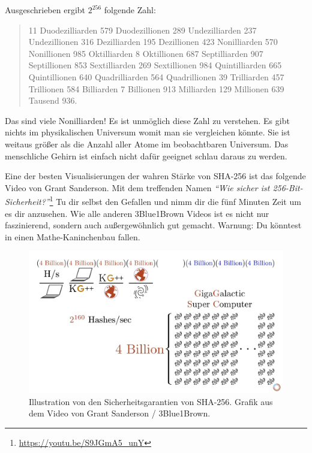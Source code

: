 Ausgeschrieben ergibt $2^{256}$ folgende Zahl:

\begin{quotation}\begin{samepage}
    11 Duodezilliarden 579 Duodezillionen 289 Undezilliarden 237 Undezillionen
    316 Dezilliarden 195 Dezillionen 423 Nonilliarden 570 Nonillionen 985
    Oktilliarden 8 Oktillionen 687 Septilliarden 907 Septillionen 853
    Sextilliarden 269 Sextillionen 984 Quintilliarden 665 Quintillionen 640
    Quadrilliarden 564 Quadrillionen 39 Trilliarden 457 Trillionen 584
    Billiarden 7 Billionen 913 Milliarden 129 Millionen 639 Tausend 936.
\end{samepage}\end{quotation}

Das sind viele Nonilliarden! Es ist unmöglich diese Zahl zu verstehen. Es gibt
nichts im physikalischen Universum womit man sie vergleichen könnte. Sie ist
weitaus größer als die Anzahl aller Atome im beobachtbaren Universum. Das
menschliche Gehirn ist einfach nicht dafür geeignet schlau daraus zu werden.

Eine der besten Visualisierungen der wahren Stärke von SHA-256 ist das folgende
Video von Grant Sanderson. Mit dem treffenden Namen \textit{\enquote{Wie sicher
ist 256-Bit-Sicherheit?}}\footnote{\url{https://youtu.be/S9JGmA5_unY}} Tu dir
selbst den Gefallen und nimm dir die fünf Minuten Zeit um es dir anzusehen. Wie
alle anderen 3Blue1Brown Videos ist es nicht nur faszinierend, sondern auch
außergewöhnlich gut gemacht. Warnung: Du könntest in einen Mathe-Kaninchenbau
fallen.

\begin{figure}
  \includegraphics{assets/images/youtube-vid-inverted.png}
  \caption{Illustration von den Sicherheitsgarantien von SHA-256. Grafik aus dem Video von Grant Sanderson / 3Blue1Brown.}
  \label{fig:youtube-vid-inverted}
\end{figure}

